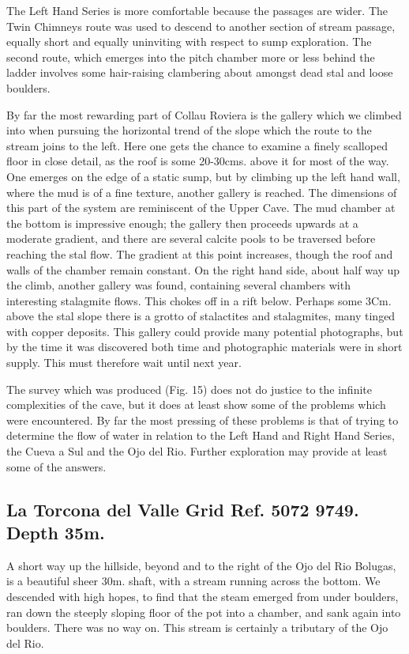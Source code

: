 \documentclass[11pt, a4paper, twoside]{memoir}
\begin{document}
The Left Hand Series is more comfortable because the passages are wider. The Twin Chimneys route was used to descend to another section of stream passage, equally short and equally uninviting with respect to sump exploration. The second route, which emerges into the pitch chamber more or less behind the ladder involves some hair-raising clambering about amongst dead stal and loose boulders.

By far the most rewarding part of Collau Roviera is the gallery which we climbed into when pursuing the horizontal trend of the slope which the route to the stream joins to the left. Here one gets the chance to examine a finely scalloped floor in close detail, as the roof is some 20-30cms. above it for most of the way. One emerges on the edge of a static sump, but by climbing up the left hand wall, where the mud is of a fine texture, another gallery is reached. The dimensions of this part of the system are reminiscent of the Upper Cave. The mud chamber at the bottom is impressive enough; the gallery then proceeds upwards at a moderate gradient, and there are several calcite pools to be traversed before reaching the stal flow. The gradient at this point increases, though the roof and walls of the chamber remain constant. On the right hand side, about half way up the climb, another gallery was found, containing several chambers with interesting stalagmite flows. This chokes off in a rift below. Perhaps some 3Cm. above the stal slope there is a grotto of stalactites and stalagmites, many tinged with copper deposits. This gallery could provide many potential photographs, but by the time it was discovered both time and photographic materials were in short supply. This must therefore wait until next year.

The survey which was produced (Fig. 15) does not do justice to the infinite complexities of the cave, but it does at least show some of the problems which were encountered. By far the most pressing of these problems is that of trying to determine the flow of water in relation to the Left Hand and Right Hand Series, the Cueva a Sul and the Ojo del Rio. Further exploration may provide at least some of the answers.




\subsection*{La Torcona del Valle Grid Ref. 5072 9749. Depth 35m.}


A short way up the hillside, beyond and to the right of the Ojo del Rio Bolugas, is a beautiful sheer 30m. shaft, with a stream running across the bottom. We descended with high hopes, to find that the steam emerged from under boulders, ran down the steeply sloping floor of the pot into a chamber, and sank again into boulders. There was no way on. This stream is certainly a tributary of the Ojo del Rio.
\end{document}
